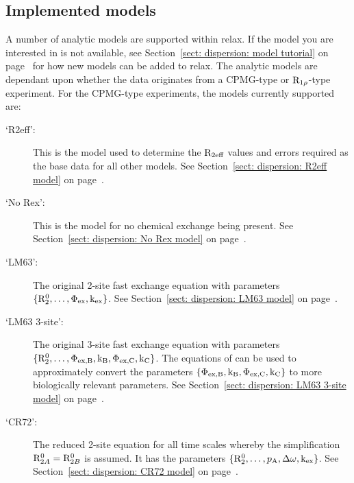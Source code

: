 
\subsection{Implemented models}
\label{sect: dispersion: implemented models}

A number of analytic models are supported within relax.
If the model you are interested in is not available, see Section~\ref{sect: dispersion: model tutorial} on page~\pageref{sect: dispersion: model tutorial} for how new models can be added to relax.
The analytic models are dependant upon whether the data originates from a CPMG-type or $\mathrm{R}_{1\rho}$-type experiment.
For the CPMG-type experiments, the models currently supported are:

\begin{description}
\item[`R2eff':]  This is the model used to determine the $\mathrm{R}_{2\textrm{eff}}$ values and errors required as the base data for all other models.  See Section~\ref{sect: dispersion: R2eff model} on page~\pageref{sect: dispersion: R2eff model}.
\item[`No Rex':]  This is the model for no chemical exchange being present.  See Section~\ref{sect: dispersion: No Rex model} on page~\pageref{sect: dispersion: No Rex model}.
\item[`LM63':]  The original \citet{LuzMeiboom63} 2-site fast exchange equation with parameters $\{\mathrm{R}_2^0, \dots, \Phi_\textrm{ex}, \textrm{k}_\textrm{ex}\}$.  See Section~\ref{sect: dispersion: LM63 model} on page~\pageref{sect: dispersion: LM63 model}.
\item[`LM63 3-site':]  The original \citet{LuzMeiboom63} 3-site fast exchange equation with parameters $\{\mathrm{R}_2^0, \dots, \Phi_\textrm{ex,B}, \textrm{k}_\textrm{B}, \Phi_\textrm{ex,C}, \textrm{k}_\textrm{C}\}$.  The equations of \citet{OConnell09} can be used to approximately convert the parameters $\{\Phi_\textrm{ex,B}, \textrm{k}_\textrm{B}, \Phi_\textrm{ex,C}, \textrm{k}_\textrm{C}\}$ to more biologically relevant parameters.  See Section~\ref{sect: dispersion: LM63 3-site model} on page~\pageref{sect: dispersion: LM63 3-site model}.
\item[`CR72':]  The reduced \citet{CarverRichards72} 2-site equation for all time scales whereby the simplification $\mathrm{R}_{2A}^0 = \mathrm{R}_{2B}^0$ is assumed.  It has the parameters $\{\mathrm{R}_2^0, \dots, p_\textrm{A}, \Delta\omega, \textrm{k}_\textrm{ex}\}$.  See Section~\ref{sect: dispersion: CR72 model} on page~\pageref{sect: dispersion: CR72 model}.

\end{description}
